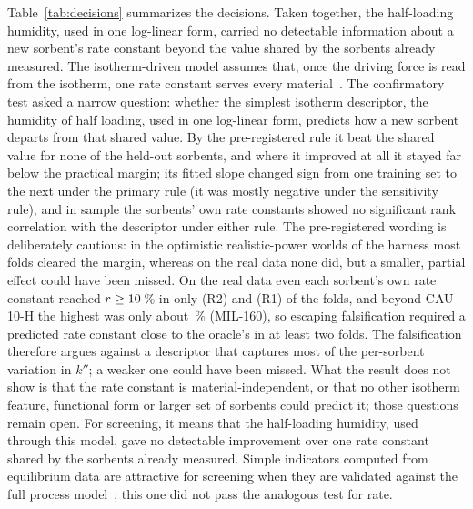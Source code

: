 \documentclass[12pt]{article}
\newcommand{\kpp}{k''}
\begin{document}
Table~\ref{tab:decisions} summarizes the decisions. Taken together, the half-loading humidity, used in one log-linear
form, carried no detectable information about a new sorbent's rate constant beyond the value shared by the sorbents
already measured. The isotherm-driven model assumes that, once the driving force is read from the isotherm, one rate constant serves
every material~\cite{Bezrukov2023Regeneration}. The confirmatory test asked a narrow question: whether the simplest
isotherm descriptor, the humidity of half loading, used in one log-linear form, predicts how a new sorbent departs
from that shared value. By the pre-registered rule it beat the shared value for none of the  held-out sorbents, and where it
improved at all it stayed far below the practical margin; its fitted slope changed sign from one training set to the
next under the primary rule (it was mostly negative under the sensitivity rule), and in sample the sorbents' own rate
constants showed no significant rank correlation with the descriptor under either rule. The pre-registered wording is deliberately cautious: in the optimistic realistic-power worlds of the harness most
folds cleared the margin, whereas on the real data none did, but a smaller, partial effect could have been missed. On the real data even each sorbent's own rate constant reached
$r \ge \V{dis_m10}{10}$\,\% in only  (R2) and  (R1) of the  folds, and beyond CAU-10-H the
highest was only about \,\% (MIL-160), so escaping falsification required a predicted rate constant close to
the oracle's in at least two folds. The falsification therefore argues against a descriptor that captures most of the
per-sorbent variation in $\kpp$; a weaker one could have been missed. What the result does not show is that the rate constant is material-independent, or that
no other isotherm feature, functional form or larger set of sorbents could predict it; those questions remain open.
For screening, it means that the half-loading humidity, used through this model, gave no detectable improvement over
one rate constant shared by the sorbents already measured. Simple indicators computed from equilibrium data are
attractive for screening when they are validated against the full process model~\cite{Dias2023Performance}; this one
did not pass the analogous test for rate.
\end{document}
